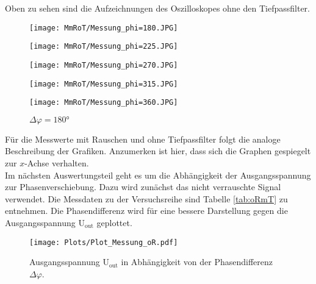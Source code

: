 Oben zu sehen sind die Aufzeichnungen des Oszilloskopes ohne den Tiefpassfilter.
\newpage

\begin{figure}[!h]
\begin{minipage}[t]{0.3\textwidth}
\texttt{[image: MmRoT/Messung\_phi=180.JPG]}
\label{fig:6}
\caption*{$\Delta\varphi = 0\si{\degree}$}
\end{minipage}
\hspace{10pt}
\vspace{5pt}
\begin{minipage}[t]{0.3\textwidth}
\texttt{[image: MmRoT/Messung\_phi=225.JPG]}
\label{fig:7}
\caption*{$\Delta\varphi = 45\si{\degree}$}
\end{minipage}
\hspace{10pt}
\vspace{5pt}
\begin{minipage}[t]{0.3\textwidth}
\texttt{[image: MmRoT/Messung\_phi=270.JPG]}
\label{fig:8}
\caption*{$\Delta\varphi = 90\si{\degree}$}
\end{minipage}
\hspace{10pt}
\vspace{5pt}
\begin{minipage}[t]{0.3\textwidth}
\texttt{[image: MmRoT/Messung\_phi=315.JPG]}
\label{fig:9}
\caption*{$\Delta\varphi = 135\si{\degree}$}
\end{minipage}
\hspace{12pt}
\vspace{5pt}
\begin{minipage}[t]{0.3\textwidth}
\texttt{[image: MmRoT/Messung\_phi=360.JPG]}
\label{fig:10}
\caption*{$\Delta\varphi = 180\si{\degree}$}
\end{minipage}
\hspace{12pt}
\vspace{5pt}
\end{figure}

Für die Messwerte mit Rauschen und ohne Tiefpassfilter folgt die analoge Beschreibung der Grafiken. Anzumerken ist hier,
dass sich die Graphen gespiegelt zur $x$-Achse verhalten. \\

Im nächsten Auswertungsteil geht es um die Abhängigkeit der Ausgangsspannung zur Phasenverschiebung.
Dazu wird zunächst das nicht verrauschte Signal verwendet. Die Messdaten zu der Versuchsreihe sind Tabelle \ref{tab:oRmT}
zu entnehmen. Die Phasendifferenz wird für eine bessere Darstellung gegen die Ausgangsspannung U$_\text{out}$ geplottet.
\begin{figure}[!h]
  \centering
  \texttt{[image: Plots/Plot\_Messung\_oR.pdf]}
  \caption{Ausgangsspannung U$_\text{out}$ in Abhängigkeit von der Phasendifferenz $\Delta\varphi$.}
  \label{fig:Uout}
\end{figure}
